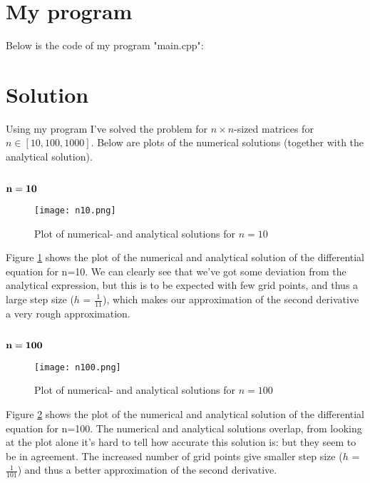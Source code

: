 \documentclass[norsk,a4paper,12pt]{article}
\begin{document}
\section{My program}
Below is the code of my program "main.cpp": 

\small

\normalsize


\section{Solution}
Using my program I've solved the problem for $n \times n$-sized matrices for $n \in [10,100,1000]$. Below are plots of the numerical solutions (together with the analytical solution).

\subsection*{$\bf{n=10}$}
\begin{figure}[ht!]
    \centering
    \texttt{[image: n10.png]}     
    \caption{Plot of numerical- and analytical solutions for $n = 10$}
    \label{fig:plot_n10}
\end{figure}

Figure \ref{fig:plot_n10} shows the plot of the numerical and analytical solution of the differential equation for n=10. We can clearly see that we've got some deviation from the analytical expression, but this is to be expected with few grid points, and thus a large step size ($h$ = $\frac{1}{11}$), which makes our approximation of the second derivative a very rough approximation.



\subsection*{$\bf{n=100}$}
\begin{figure}[ht!]
    \centering
    \texttt{[image: n100.png]}     
    \caption{Plot of numerical- and analytical solutions for $n = 100$}
    \label{fig:plot_n100}
\end{figure}

Figure \ref{fig:plot_n100} shows the plot of the numerical and analytical solution of the differential equation for n=100. The numerical and analytical solutions overlap, from looking at the plot alone it's hard to tell how accurate this solution is: but they seem to be in agreement. The increased number of grid points give smaller step size ($h$ = $\frac{1}{101}$) and thus a better approximation of the second derivative.
\end{document}
